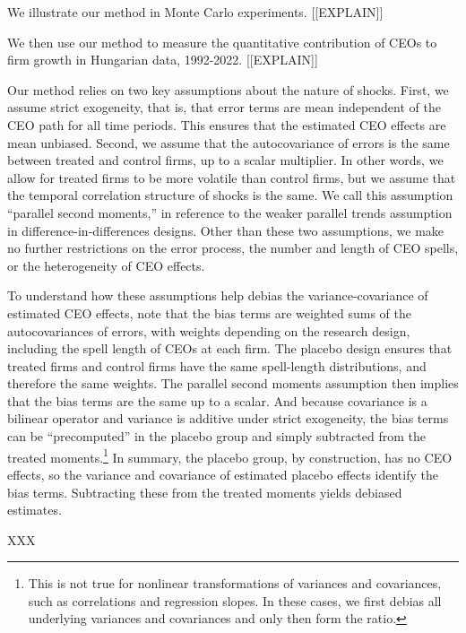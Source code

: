 \documentclass[11pt,a4paper]{article}
\begin{document}
We illustrate our method in Monte Carlo experiments. [[EXPLAIN]]

We then use our method to measure the quantitative contribution of CEOs to firm growth in Hungarian data, 1992-2022. [[EXPLAIN]]

Our method relies on two key assumptions about the nature of shocks. First, we assume strict exogeneity, that is, that error terms are mean independent of the CEO path for all time periods. This ensures that the estimated CEO effects are mean unbiased. Second, we assume that the autocovariance of errors is the same between treated and control firms, up to a scalar multiplier. In other words, we allow for treated firms to be more volatile than control firms, but we assume that the temporal correlation structure of shocks is the same. We call this assumption ``parallel second moments,'' in reference to the weaker parallel trends assumption in difference-in-differences designs. Other than these two assumptions, we make no further restrictions on the error process, the number and length of CEO spells, or the heterogeneity of CEO effects. 

To understand how these assumptions help debias the variance-covariance of estimated CEO effects, note that the bias terms are weighted sums of the autocovariances of errors, with weights depending on the research design, including the spell length of CEOs at each firm. The placebo design ensures that treated firms and control firms have the same spell-length distributions, and therefore the same weights. The parallel second moments assumption then implies that the bias terms are the same up to a scalar. And because covariance is a bilinear operator and variance is additive under strict exogeneity, the bias terms can be ``precomputed'' in the placebo group and simply subtracted from the treated moments.\footnote{This is not true for nonlinear transformations of variances and covariances, such as correlations and regression slopes. In these cases, we first debias all underlying variances and covariances and only then form the ratio.} In summary, the placebo group, by construction, has no CEO effects, so the variance and covariance of estimated placebo effects identify the bias terms. Subtracting these from the treated moments yields debiased estimates.

XXX
\end{document}
